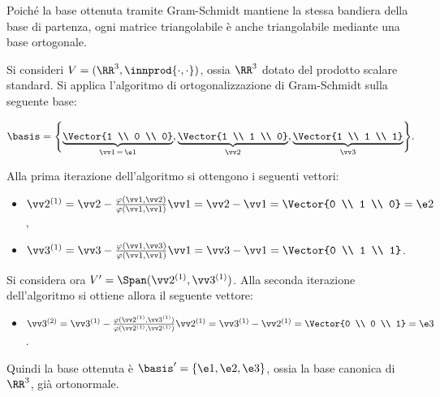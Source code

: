 \documentclass[11pt]{article}
\begin{document}
	\begin{remark}
		Poiché la base ottenuta tramite Gram-Schmidt mantiene la stessa bandiera della base di partenza,
		ogni matrice triangolabile è anche triangolabile mediante una base ortogonale.
	\end{remark}

	\begin{example}
		Si consideri $V = (\RR^3, \innprod{\cdot, \cdot})$, ossia $\RR^3$ dotato del prodotto scalare standard.
		Si applica l'algoritmo di ortogonalizzazione di Gram-Schmidt sulla seguente base:
		
		\[ \basis = \Biggl\{ \underbrace{\Vector{1 \\ 0 \\ 0}}_{\vv 1 \, = \, \e1}, \underbrace{\Vector{1 \\ 1 \\ 0}}_{\vv 2}, \underbrace{\Vector{1 \\ 1 \\ 1}}_{\vv 3} \Biggl\}. \]
		
		\vskip 0.05in
		
		Alla prima iterazione dell'algoritmo si ottengono i seguenti vettori:

		\begin{itemize}
			\item $\vv 2 ^{(1)} = \vv 2 -  \frac{\varphi(\vv 1, \vv 2)}{\varphi(\vv 1, \vv 1)} \vv 1 = \vv 2 - \vv 1 = \Vector{0 \\ 1 \\ 0} = \e 2$,
			\item $\vv 3 ^{(1)} = \vv 3 - \frac{\varphi(\vv 1, \vv 3)}{\varphi(\vv 1, \vv 1)} \vv 1 = \vv 3 - \vv 1 = \Vector{0 \\ 1 \\ 1}$.
		\end{itemize}
	
		Si considera ora $V' = \Span(\vv 2 ^{(1)}, \vv 3 ^{(1)})$. Alla seconda iterazione dell'algoritmo si
		ottiene allora il seguente vettore:
		
		\begin{itemize}
			\item $\vv 3 ^{(2)} = \vv 3 ^{(1)} - \frac{\varphi(\vv 2 ^{(1)},  \vv 3 ^{(1)})}{\varphi(\vv 2 ^{(1)}, \vv 2 ^{(1)})} \vv 2 ^{(1)} = \vv 3 ^{(1)} - \vv 2 ^{(1)} = \Vector{0 \\ 0 \\ 1} = \e 3$.
		\end{itemize}
	
		Quindi la base ottenuta è $\basis' = \{\e1, \e2, \e3\}$, ossia la base canonica di $\RR^3$, già
		ortonormale.
	\end{example}
\end{document}
